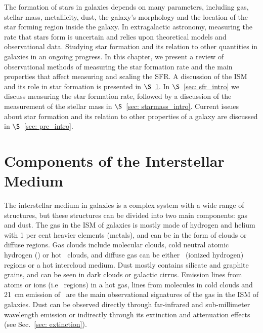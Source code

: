 The formation of stars in galaxies depends on many parameters, including gas, stellar mass, metallicity, dust, the galaxy's morphology and the location of the star forming region inside the galaxy.
In extragalactic astronomy, measuring the rate that stars form is uncertain and relies upon theoretical models and observational data.
Studying star formation and its relation to other quantities in galaxies in an ongoing progress.
In this chapter, we present a review of observational methods of measuring the star formation rate and the main properties that affect measuring and scaling the SFR. A discussion of the ISM and its role in star formation is presented in $\S$~\ref{sec: ism_intro}. In $\S$~\ref{sec: sfr_intro} we discuss measuring the star formation rate, followed by a discussion of the measurement of the stellar mass in $\S$~\ref{sec: starmass_intro}. Current issues about star formation and its relation to other properties of a galaxy are discussed in $\S$~\ref{sec: pre_intro}. 





\section{Components of the Interstellar Medium} 
\label{sec: ism_intro}
The interstellar medium in galaxies is a complex system with a wide range of structures, but these structures can be divided into two main components: gas and dust.
The gas in the ISM of galaxies is mostly made of hydrogen and helium with 1 per cent heavier elements (metals), and can be in the form of clouds or diffuse regions.
Gas clouds include molecular clouds, cold neutral atomic hydrogen (\hi) or hot \hi~clouds, and diffuse gas can be either \hii~(ionized hydrogen) regions or a hot intercloud medium.
Dust mostly contains silicate and graphite grains, and can be seen in dark clouds or galactic cirrus. %
Emission lines from atoms or ions (i.e \hii~regions) in a hot gas, lines from molecules in cold clouds and 21~cm emission of \hi~are the main observational signatures of the gas in the ISM of galaxies.
Dust can be observed directly through far-infrared and sub-millimeter wavelength emission or indirectly through its extinction and attenuation effects (see Sec.~\ref{sec: extinction}).

